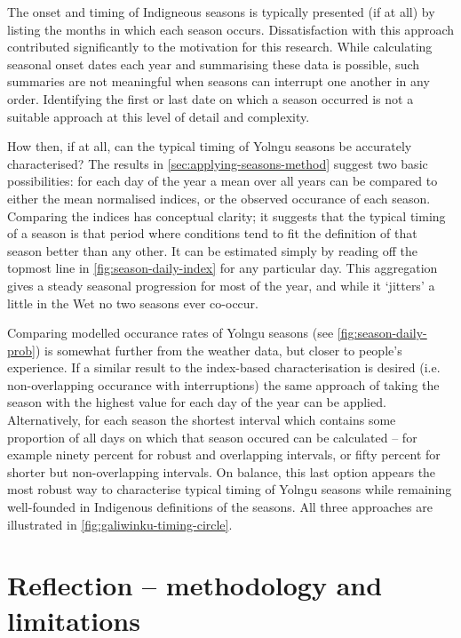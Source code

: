 The onset and timing of Indigneous seasons is typically presented (if at all)
by listing the months in which each season occurs.  Dissatisfaction with this
approach contributed significantly to the motivation for this research.
%
While calculating seasonal onset dates each year and summarising these data
is possible, such summaries are not meaningful when seasons can interrupt
one another in any order.  Identifying the first or last date on which a
season occurred is not a suitable approach at this level of detail and complexity.

How then, if at all, can the typical timing of Yolngu seasons be accurately
characterised?  The results in \cref{sec:applying-seasons-method} suggest two
basic possibilities: for each day of the year a mean over all years can be
compared to either the mean normalised indices, or the observed occurance
of each season.
%
Comparing the indices has conceptual clarity; it suggests that the
typical timing of a season is that period where conditions tend to fit the
definition of that season better than any other.  It can be estimated simply
by reading off the topmost line in \cref{fig:season-daily-index} for any
particular day.  This aggregation gives a steady seasonal progression for most of the
year, and while it `jitters' a little in the Wet no two seasons ever co-occur.

Comparing modelled occurance rates of Yolngu seasons (see \cref{fig:season-daily-prob}) is somewhat
further from the weather data, but closer to people's experience.  If a similar
result to the index-based characterisation is desired (i.e. non-overlapping occurance
with interruptions) the same approach of taking the season
with the highest value for each day of the year can be applied.
%
Alternatively, for each season the shortest interval which contains some
proportion of all days on which that season occured can be calculated --
for example ninety percent for robust and overlapping intervals, or fifty percent for
shorter but non-overlapping intervals.  On balance, this last option
appears the most robust way to characterise typical timing of Yolngu seasons while
remaining well-founded in Indigenous definitions of the seasons.
%
All three approaches are illustrated in \cref{fig:galiwinku-timing-circle}.



\section{Reflection -- methodology and limitations}
\label{sec:disc-reflection}

